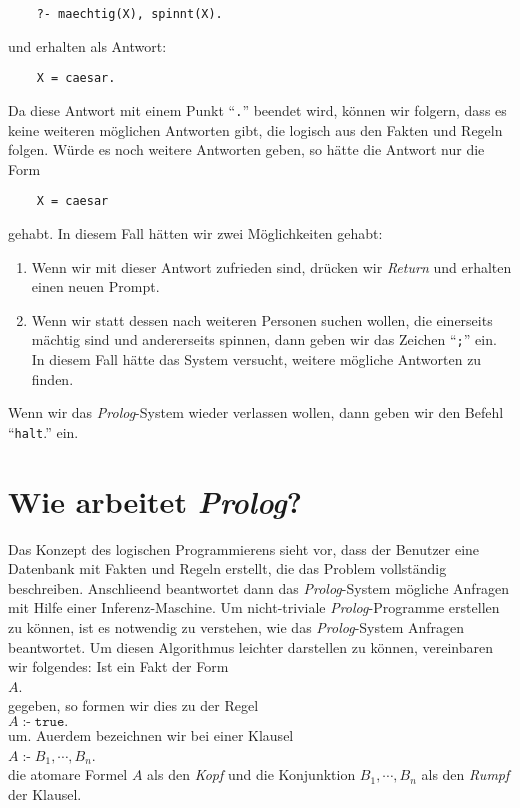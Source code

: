 \begin{verbatim}
    ?- maechtig(X), spinnt(X).
\end{verbatim}
und erhalten als Antwort:
\begin{verbatim}
    X = caesar.
\end{verbatim}
Da diese Antwort mit einem Punkt ``\texttt{.}'' beendet wird, k\"{o}nnen wir folgern, dass es keine
weiteren m\"{o}glichen Antworten gibt, die logisch aus den Fakten und Regeln folgen.  W\"{u}rde es noch
weitere Antworten geben, so h\"{a}tte die Antwort nur die Form 
\begin{verbatim}
    X = caesar
\end{verbatim}
gehabt.  In diesem Fall h\"{a}tten wir zwei M\"{o}glichkeiten gehabt:
\begin{enumerate}
\item Wenn wir mit dieser Antwort zufrieden sind, dr\"{u}cken wir \textsl{Return} und erhalten einen
      neuen Prompt.
\item Wenn wir statt dessen nach weiteren Personen suchen wollen, die einerseits
      m\"{a}chtig sind und andererseits spinnen, dann geben wir das Zeichen ``\texttt{;}'' ein.
      In diesem Fall h\"{a}tte das System versucht, weitere m\"{o}gliche Antworten zu finden.
\end{enumerate} 
Wenn wir das \textsl{Prolog}-System wieder verlassen wollen, dann geben wir den Befehl
``\texttt{halt}.'' ein.

\section{Wie arbeitet \textsl{Prolog}?}
Das Konzept des logischen Programmierens sieht vor, dass der Benutzer eine Datenbank mit
Fakten und Regeln erstellt, die das Problem vollst\"{a}ndig beschreiben.  Anschlie\3end
beantwortet dann das \textsl{Prolog}-System m\"{o}gliche Anfragen mit Hilfe einer
Inferenz-Maschine.  Um nicht-triviale \textsl{Prolog}-Programme erstellen zu k\"{o}nnen, ist es
notwendig zu verstehen, wie das \textsl{Prolog}-System Anfragen beantwortet.
Um diesen Algorithmus leichter darstellen zu k\"{o}nnen, vereinbaren wir folgendes:
Ist ein Fakt der Form \\[0.2cm]
\hspace*{1.3cm} $A$.
\\[0.2cm]
gegeben, so formen wir dies zu der Regel \\[0.2cm]
\hspace*{1.3cm} $A \;\texttt{:-}\; \texttt{true}.$ \\[0.2cm]
um.  Au\3erdem bezeichnen wir bei einer Klausel \\[0.2cm]
\hspace*{1.3cm} $A \;\texttt{:-}\; B_1, \cdots, B_n$. \\[0.2cm]
die atomare Formel $A$ als den \emph{Kopf} und die Konjunktion $B_1, \cdots, B_n$
als den \emph{Rumpf} der Klausel.
\vspace*{0.2cm}

